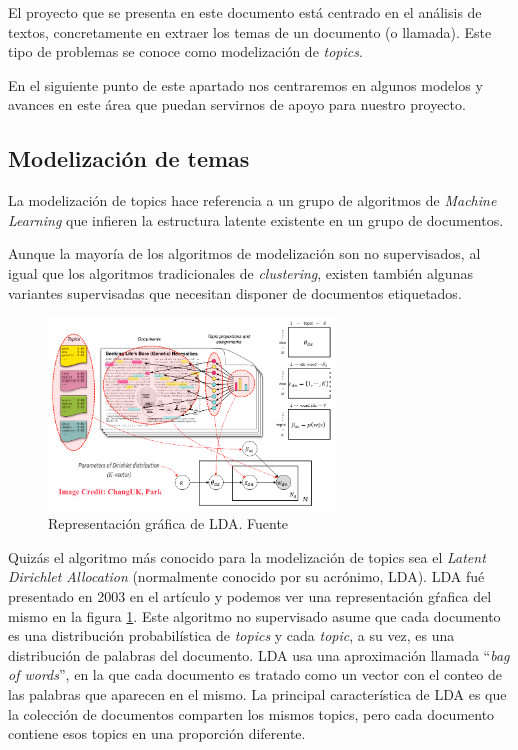 El proyecto que se presenta en este documento está centrado en el análisis de textos, concretamente en extraer los temas de un documento (o llamada). Este tipo de problemas se conoce como modelización de \textit{topics}. 

En el siguiente punto de este apartado nos centraremos en algunos modelos y avances en este área que puedan servirnos de apoyo para nuestro proyecto. 


\subsection{Modelización de temas}
\label{section:arte:lda}
La modelización de topics hace referencia a un grupo de algoritmos de \textit{Machine Learning} que infieren la estructura latente existente en un grupo de documentos. 


Aunque la mayoría de los algoritmos de modelización son no supervisados, al igual que los algoritmos tradicionales de \textit{clustering}, existen también algunas variantes supervisadas que necesitan disponer de documentos etiquetados. 


\begin{figure}[!ht]
	\centering
	\includegraphics[width=0.68\textwidth]{images/arte/lda}
	\caption{Representación gráfica de LDA. Fuente \cite{ldafig}}
	\label{fig:lda}
\end{figure}


Quizás el algoritmo más conocido para la modelización de topics sea el \textit{Latent Dirichlet Allocation} (normalmente conocido por su acrónimo, LDA). LDA fué presentado en 2003 en el artículo \cite{Blei_LDA} y podemos ver una representación gŕafica del mismo en la figura \ref{fig:lda}. Este algoritmo no supervisado asume que cada documento es una distribución probabilística de \textit{topics} y cada \textit{topic}, a su vez, es una distribución de palabras del documento. LDA usa una aproximación llamada ``\textit{bag of words}'', en la que cada documento es tratado como un vector con el conteo de las palabras que aparecen en el mismo. La principal característica de LDA es que la colección de documentos comparten los mismos topics, pero cada documento contiene esos topics en una proporción diferente. 



